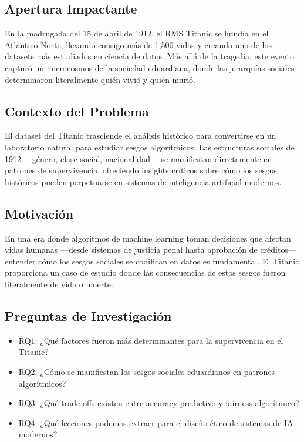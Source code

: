 \documentclass[conference]{IEEEtran}
\begin{document}
\subsection{Apertura Impactante}
En la madrugada del 15 de abril de 1912, el RMS Titanic se hundía en el Atlántico Norte, llevando consigo más de 1,500 vidas y creando uno de los datasets más estudiados en ciencia de datos. Más allá de la tragedia, este evento capturó un microcosmos de la sociedad eduardiana, donde las jerarquías sociales determinaron literalmente quién vivió y quién murió.

\subsection{Contexto del Problema}
El dataset del Titanic trasciende el análisis histórico para convertirse en un laboratorio natural para estudiar sesgos algorítmicos. Las estructuras sociales de 1912 —género, clase social, nacionalidad— se manifiestan directamente en patrones de supervivencia, ofreciendo insights críticos sobre cómo los sesgos históricos pueden perpetuarse en sistemas de inteligencia artificial modernos.

\subsection{Motivación}
En una era donde algoritmos de machine learning toman decisiones que afectan vidas humanas —desde sistemas de justicia penal hasta aprobación de créditos— entender cómo los sesgos sociales se codifican en datos es fundamental. El Titanic proporciona un caso de estudio donde las consecuencias de estos sesgos fueron literalmente de vida o muerte.

\subsection{Preguntas de Investigación}

\begin{itemize}
    \item RQ1: ¿Qué factores fueron más determinantes para la supervivencia en el Titanic?
    \item RQ2: ¿Cómo se manifiestan los sesgos sociales eduardianos en patrones algorítmicos?
    \item RQ3: ¿Qué trade-offs existen entre accuracy predictivo y fairness algorítmico?
    \item RQ4: ¿Qué lecciones podemos extraer para el diseño ético de sistemas de IA modernos?
\end{itemize}
\end{document}
